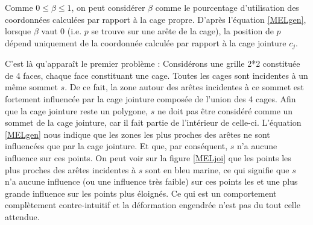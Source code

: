 Comme $0 \leq \beta \leq 1$, on peut considérer $\beta$ comme le
pourcentage d'utilisation des coordonnées calculées par rapport à la
cage propre. D'après l'équation \ref{MELgen}, lorsque $\beta$ vaut 0
(i.e. $p$ se trouve sur une arête de la cage), la position de $p$
dépend uniquement de la coordonnée calculée par rapport à la cage
jointure $c_j$.

C'est là qu'apparaît le premier problème : Considérons une grille 2*2
constituée de 4 faces, chaque face constituant une cage. Toutes les
cages sont incidentes à un même sommet $s$. De ce fait, la zone autour
des arêtes incidentes à ce sommet est fortement influencée par la cage
jointure composée de l'union des 4 cages. Afin que la cage jointure
reste un polygone, $s$ ne doit pas être considéré comme un sommet de
la cage jointure, car il fait partie de l'intérieur de
celle-ci. L'équation \ref{MELgen} nous indique que les zones les plus
proches des arêtes ne sont influencées que par la cage jointure. Et
que, par conséquent, $s$ n'a aucune influence sur ces points. On peut
voir sur la figure \ref{MELjoi} que les points les plus proches des
arêtes incidentes à $s$ sont en bleu marine, ce qui signifie que $s$
n'a aucune influence (ou une influence très faible) sur ces points les
et une plus grande influence sur les points plus éloignés. Ce qui est
un comportement complètement contre-intuitif et la déformation
engendrée n'est pas du tout celle attendue.

